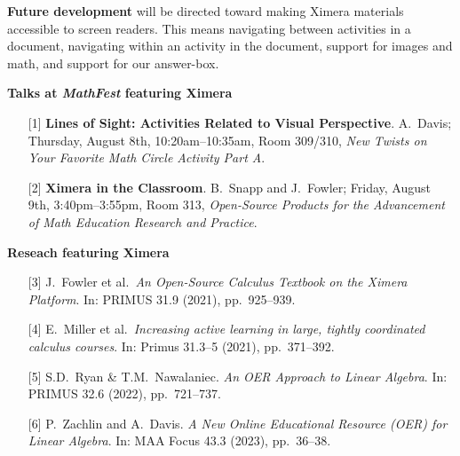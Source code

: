 \documentclass[twocolumn]{article}
\makeatletter
\newcommand{\mylabel}[2]{#2\def\@currentlabel{#2}\label{#1}}
\makeatother
\begin{document}
\begin{xframe}
    {\sffamily\bfseries Future development} will be directed toward making
    Ximera materials accessible to screen readers. This means navigating
    between activities in a document, navigating within an activity in the
    document, support for images and math, and support for our answer-box.
\end{xframe}
\restoregeometry

\begin{xframe}
    {\sffamily\bfseries Talks at \textsl{MathFest} featuring Ximera}
    \begin{itemize}
        \item[{[1]}] \textbf{Lines of Sight: Activities Related to Visual
            Perspective}. A.\ Davis; Thursday, August 8th,
        10:20am--10:35am,
        Room 309/310,
        \textit{New Twists on Your Favorite Math Circle Activity Part A}.
        \item[{[2]}] \textbf{Ximera in the Classroom}. B.\ Snapp and J.\
        Fowler;
        Friday, August 9th, 3:40pm--3:55pm, Room 313, \textit{Open-Source
            Products for
            the Advancement of Math Education Research and Practice}.
    \end{itemize}
\end{xframe}

\begin{xframe}
    {\sffamily\bfseries Reseach featuring Ximera}
    \begin{itemize}
        \item[\mylabel{F21}{[3]}] J.\ Fowler et al.\ \textit{An Open-Source
            Calculus
            Textbook on the Ximera Platform}. In:
        PRIMUS 31.9 (2021), pp.\ 925--939. %
        \item[{[4]}] E.\ Miller et al.\ \textit{Increasing active learning in
            large, tightly coordinated calculus courses}. In: Primus 31.3--5
        (2021), pp.\
        371--392.
        \item[{[5]}]S.D.\ Ryan \& T.M.\ Nawalaniec. \textit{An OER Approach to
            Linear Algebra}. In: PRIMUS 32.6 (2022), pp.\ 721--737.
        \item[{[6]}] P.\ Zachlin and A.\ Davis. \textit{A New Online
            Educational Resource (OER)
            for Linear Algebra}. In: MAA Focus 43.3 (2023), pp.\ 36--38.
    \end{itemize}
\end{xframe}
\end{document}
